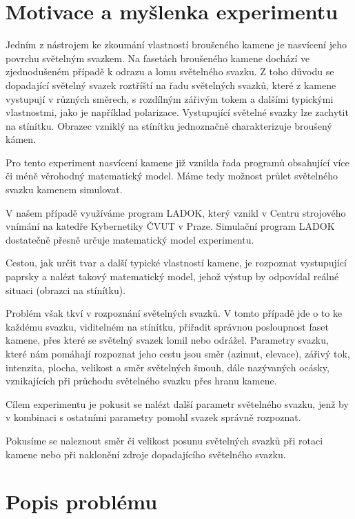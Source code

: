 \section{Motivace a myšlenka experimentu}

Jedním z nástrojem ke zkoumání vlastností broušeného kamene je nasvícení jeho povrchu světelným svazkem. Na fasetách broušeného kamene dochází ve zjednodušeném případě k odrazu a lomu světelného svazku. Z toho důvodu se dopadající světelný svazek roztříští na řadu světelných svazků, které z kamene vystupují v různých směrech, s rozdílným zářivým tokem a dalšími typickými vlastnostmi, jako je například polarizace. 
Vystupující světelné svazky lze zachytit na stínítku. Obrazec vzniklý na stínítku jednoznačně charakterizuje broušený kámen. 

Pro tento experiment nasvícení kamene již vznikla řada programů obsahující více či méně věrohodný matematický model. Máme tedy možnost průlet světelného svazku kamenem simulovat. 

V našem případě využíváme program LADOK, který vznikl v Centru strojového vnímání na katedře Kybernetiky ČVUT v Praze. Simulační program LADOK dostatečně přesně určuje matematický model experimentu.

Cestou, jak určit tvar a další typické vlastností kamene, je rozpoznat vystupující paprsky a nalézt takový matematický model, jehož výstup by odpovídal reálné situaci (obrazci na stínítku). 

Problém však tkví v rozpoznání světelných svazků. V tomto případě jde o to ke každému svazku, viditelném na stínítku, přiřadit správnou posloupnost faset kamene, přes které se světelný svazek lomil nebo odrážel. Parametry svazku, které nám pomáhají rozpoznat jeho cestu jsou směr (azimut, elevace), zářivý tok, intenzita, plocha, velikost a směr světelných šmouh, dále nazývaných ocásky, vznikajících při průchodu světelného svazku přes hranu kamene. 

Cílem experimentu je pokusit se nalézt další parametr světelného svazku, jenž by v kombinaci s ostatními parametry pomohl svazek správně rozpoznat. 

Pokusíme se naleznout směr či velikost posunu světelných svazků při rotaci kamene nebo při naklonění zdroje dopadajícího světelného svazku. 

\newpage
\section{Popis problému}

